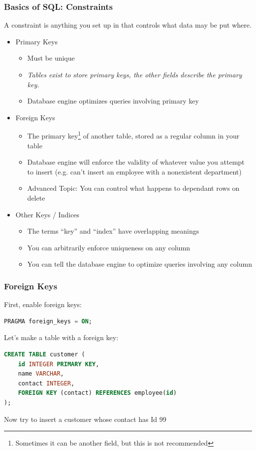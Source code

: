 \documentclass[aspectratio=169]{beamer}
\begin{document}
\begin{frame}
    \frametitle{Basics of SQL: Constraints}

    A constraint is anything you set up in that controls what data may be put where.
    \pause
    \begin{itemize}
        \item Primary Keys
        \begin{itemize}
            \item Must be unique
            \item \emph{Tables exist to store primary keys, the other fields describe the primary key.}
            \item Database engine optimizes queries involving primary key
        \end{itemize}
        \pause
        \item Foreign Keys
        \begin{itemize}
            \item The primary key\footnote[frame]{Sometimes it can be
            another field, but this is not recommended} of another table, stored
            as a regular column in your table
            \item Database engine will enforce the validity of whatever value
            you attempt to insert (e.g. can't insert an employee with a
            nonexistent department)
            \item Advanced Topic: You can control what happens to dependant rows
            on delete
        \end{itemize}
        \pause
        \item Other Keys / Indices
        \begin{itemize}
            \item The terms ``key'' and ``index'' have overlapping meanings
            \item You can arbitrarily enforce uniqueness on any column
            \item You can tell the database engine to optimize queries involving
            any column
        \end{itemize}
    \end{itemize}
\end{frame}
\begin{frame}[fragile]
    \frametitle{Foreign Keys}
    First, enable foreign keys:
    \begin{lstlisting}[language=SQL]
PRAGMA foreign_keys = ON;
    \end{lstlisting}
    Let's make a table with a foreign key:
    \begin{lstlisting}[language=SQL]
CREATE TABLE customer (
    id INTEGER PRIMARY KEY,
    name VARCHAR,
    contact INTEGER,
    FOREIGN KEY (contact) REFERENCES employee(id)
);
    \end{lstlisting}
    \pause
    Now try to insert a customer whose contact has Id 99
\end{frame}
\end{document}
